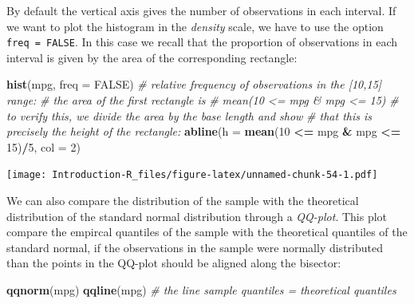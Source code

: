 \documentclass[]{book}
\newenvironment{Shaded}{\begin{snugshade}}{\end{snugshade}}
\newcommand{\CommentTok}[1]{\textcolor[rgb]{0.56,0.35,0.01}{\textit{#1}}}
\newcommand{\DataTypeTok}[1]{\textcolor[rgb]{0.13,0.29,0.53}{#1}}
\newcommand{\DecValTok}[1]{\textcolor[rgb]{0.00,0.00,0.81}{#1}}
\newcommand{\KeywordTok}[1]{\textcolor[rgb]{0.13,0.29,0.53}{\textbf{#1}}}
\newcommand{\NormalTok}[1]{#1}
\newcommand{\OperatorTok}[1]{\textcolor[rgb]{0.81,0.36,0.00}{\textbf{#1}}}
\newcommand{\OtherTok}[1]{\textcolor[rgb]{0.56,0.35,0.01}{#1}}
\newcommand{\StringTok}[1]{\textcolor[rgb]{0.31,0.60,0.02}{#1}}
\begin{document}
\begin{Shaded}
\end{Shaded}

By default the vertical axis gives the number of observations in each interval. If we want to plot the histogram in the \emph{density} scale, we have to use the option \texttt{freq\ =\ FALSE}. In this case we recall that the proportion of observations in each interval is given by the area of the corresponding rectangle:

\begin{Shaded}
\begin{Highlighting}[]
\KeywordTok{hist}\NormalTok{(mpg, }\DataTypeTok{freq =} \OtherTok{FALSE}\NormalTok{)}
\CommentTok{# relative frequency of observations in the [10,15] range:}
\CommentTok{# the area of the first rectangle is}
\CommentTok{# mean(10 <= mpg & mpg <= 15)}
\CommentTok{# to verify this, we divide the area by the base length and show}
\CommentTok{# that this is precisely the height of the rectangle:}
\KeywordTok{abline}\NormalTok{(}\DataTypeTok{h =} \KeywordTok{mean}\NormalTok{(}\DecValTok{10} \OperatorTok{<=}\StringTok{ }\NormalTok{mpg }\OperatorTok{&}\StringTok{ }\NormalTok{mpg }\OperatorTok{<=}\StringTok{ }\DecValTok{15}\NormalTok{)}\OperatorTok{/}\DecValTok{5}\NormalTok{, }\DataTypeTok{col =} \DecValTok{2}\NormalTok{)}
\end{Highlighting}
\end{Shaded}

\texttt{[image: Introduction-R\_files/figure-latex/unnamed-chunk-54-1.pdf]}

We can also compare the distribution of the sample with the theoretical distribution of the standard normal distribution through a \emph{QQ-plot}. This plot compare the empircal quantiles of the sample with the theoretical quantiles of the standard normal, if the observations in the sample were normally distributed than the points in the QQ-plot should be aligned along the bisector:

\begin{Shaded}
\begin{Highlighting}[]
\KeywordTok{qqnorm}\NormalTok{(mpg)}
\KeywordTok{qqline}\NormalTok{(mpg) }\CommentTok{# the line sample quantiles = theoretical quantiles}
\end{Highlighting}
\end{Shaded}
\end{document}
